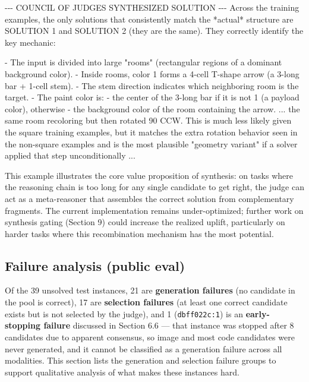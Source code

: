 \documentclass[11pt]{article}
\newenvironment{Shaded}{}{}
\newcommand{\NormalTok}[1]{#1}
\renewenvironment{Shaded}{\begin{snugshade}}{\end{snugshade}}
\begin{document}
\begin{Shaded}
\begin{Highlighting}[]
\NormalTok{{-}{-}{-} COUNCIL OF JUDGES SYNTHESIZED SOLUTION {-}{-}{-}}
\NormalTok{Across the training examples, the only solutions that}
\NormalTok{consistently match the *actual* structure are SOLUTION 1}
\NormalTok{and SOLUTION 2 (they are the same). They correctly}
\NormalTok{identify the key mechanic:}

\NormalTok{{-} The input is divided into large "rooms" (rectangular}
\NormalTok{  regions of a dominant background color).}
\NormalTok{{-} Inside rooms, color 1 forms a 4{-}cell T{-}shape arrow}
\NormalTok{  (a 3{-}long bar + 1{-}cell stem).}
\NormalTok{{-} The stem direction indicates which neighboring room}
\NormalTok{  is the target.}
\NormalTok{{-} The paint color is:}
\NormalTok{  {-} the center of the 3{-}long bar if it is not 1}
\NormalTok{    (a payload color), otherwise}
\NormalTok{  {-} the background color of the room containing}
\NormalTok{    the arrow.}
\NormalTok{...}
\NormalTok{the same room recoloring but then rotated 90 CCW.}
\NormalTok{This is much less likely given the square training}
\NormalTok{examples, but it matches the extra rotation behavior}
\NormalTok{seen in the non{-}square examples and is the most}
\NormalTok{plausible "geometry variant" if a solver applied}
\NormalTok{that step unconditionally}
\NormalTok{...}
\end{Highlighting}
\end{Shaded}

This example illustrates the core value proposition of synthesis: on
tasks where the reasoning chain is too long for any single candidate to
get right, the judge can act as a meta-reasoner that assembles the
correct solution from complementary fragments. The current
implementation remains under-optimized; further work on synthesis gating
(Section 9) could increase the realized uplift, particularly on harder
tasks where this recombination mechanism has the most potential.

\hypertarget{failure-analysis-public-eval}{%
\subsection{Failure analysis (public
eval)}\label{failure-analysis-public-eval}}

Of the 39 unsolved test instances, 21 are \textbf{generation failures}
(no candidate in the pool is correct), 17 are \textbf{selection
failures} (at least one correct candidate exists but is not selected by
the judge), and 1 (\texttt{dbff022c:1}) is an \textbf{early-stopping
failure} discussed in Section 6.6 --- that instance was stopped after 8
candidates due to apparent consensus, so image and most code candidates
were never generated, and it cannot be classified as a generation
failure across all modalities. This section lists the generation and
selection failure groups to support qualitative analysis of what makes
these instances hard.
\end{document}

